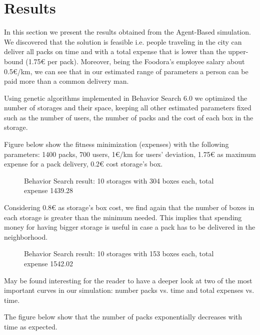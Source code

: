 \documentclass[11pt,a4paper]{article}
\begin{document}
\begin{figure}[h!]
\centering
\end{figure}

\newpage
\section{Results}
In this section we present the results obtained from the Agent-Based simulation. We discovered that the solution is feasible i.e. people traveling in the city can deliver all packs on time and with a total expense that is lower than the upper-bound (1.75\euro{} per pack). Moreover, being the Foodora's employee salary about 0.5\euro{}/km, we can see that in our estimated range of parameters a person can be paid more than a common delivery man.

Using genetic algorithms implemented in Behavior Search 6.0 we optimized the number of storages and their space, keeping all other estimated parameters fixed such as the number of users, the number of packs and the cost of each box in the storage. 

Figure below show the fitness minimization (expenses) with the following parameters: 1400 packs, 700 users, 1\euro{}/km for users' deviation, 1.75\euro{} as maximum expense for a pack delivery, 0.2\euro{} cost storage's box.

\begin{figure}[h!]
\centering
\caption{Behavior Search result: 10 storages with 304 boxes each, total expense 1439.28}
\end{figure}

Considering 0.8\euro{} as storage's box cost, we find again that the number of boxes in each storage is greater than the minimum needed. This implies that spending money for having bigger storage is useful in case a pack has to be delivered in the neighborhood.

\begin{figure}[h!]
\centering
\caption{Behavior Search result: 10 storages with 153 boxes each, total expense 1542.02}
\end{figure}

\newpage 
May be found interesting for the reader to have a deeper look at two of the most important curves in our simulation: number packs vs. time and total expenses vs. time. 

The figure below show that the number of packs exponentially decreases with time as expected.
\end{document}
